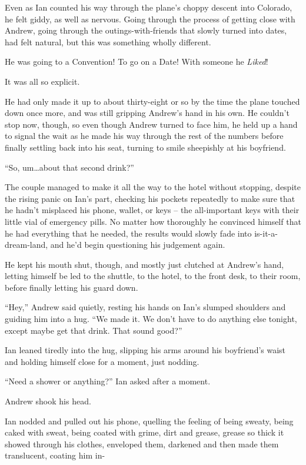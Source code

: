 Even as Ian counted his way through the plane's choppy descent into Colorado, he felt giddy, as well as nervous. Going through the process of getting close with Andrew, going through the outings-with-friends that slowly turned into dates, had felt natural, but this was something wholly different.

He was going to a Convention! To go on a Date! With someone he \textit{Liked}!

It was all so explicit.

He had only made it up to about thirty-eight or so by the time the plane touched down once more, and was still gripping Andrew's hand in his own. He couldn't stop now, though, so even though Andrew turned to face him, he held up a hand to signal the wait as he made his way through the rest of the numbers before finally settling back into his seat, turning to smile sheepishly at his boyfriend.

``So, um\ldots{}about that second drink?''

\secdiv

The couple managed to make it all the way to the hotel without stopping, despite the rising panic on Ian's part, checking his pockets repeatedly to make sure that he hadn't misplaced his phone, wallet, or keys -- the all-important keys with their little vial of emergency pills. No matter how thoroughly he convinced himself that he had everything that he needed, the results would slowly fade into is-it-a-dream-land, and he'd begin questioning his judgement again.

He kept his mouth shut, though, and mostly just clutched at Andrew's hand, letting himself be led to the shuttle, to the hotel, to the front desk, to their room, before finally letting his guard down.

``Hey,'' Andrew said quietly, resting his hands on Ian's slumped shoulders and guiding him into a hug. ``We made it. We don't have to do anything else tonight, except maybe get that drink. That sound good?''

Ian leaned tiredly into the hug, slipping his arms around his boyfriend's waist and holding himself close for a moment, just nodding.

``Need a shower or anything?'' Ian asked after a moment.

Andrew shook his head.

Ian nodded and pulled out his phone, quelling the feeling of being sweaty, being caked with sweat, being coated with grime, dirt and grease, grease so thick it showed through his clothes, enveloped them, darkened and then made them translucent, coating him in-

